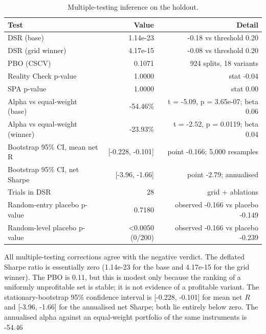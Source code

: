 \documentclass[11pt,a4paper]{article}
\begin{document}
\begin{table}[htbp]
\centering
\small
\setlength{\tabcolsep}{4pt}
\caption{Multiple-testing inference on the holdout.}
\label{tab:inference}
\begin{tabular}{lrr}
\toprule
Test & Value & Detail \\
\midrule
DSR (base) & 1.14e-23 & -0.18 vs threshold 0.20 \\
DSR (grid winner) & 4.17e-15 & -0.08 vs threshold 0.20 \\
PBO (CSCV) & 0.1071 & 924 splits, 18 variants \\
Reality Check p-value & 1.0000 & stat -0.04 \\
SPA p-value & 1.0000 & stat 0.00 \\
Alpha vs equal-weight (base) & -54.46\% & t = -5.09, p = 3.65e-07; beta 0.06 \\
Alpha vs equal-weight (winner) & -23.93\% & t = -2.52, p = 0.0119; beta 0.04 \\
Bootstrap 95\% CI, mean net R & [-0.228, -0.101] & point -0.166; 5,000 resamples \\
Bootstrap 95\% CI, net Sharpe & [-3.96, -1.66] & point -2.79; annualised \\
Trials in DSR & 28 & grid + ablations \\
Random-entry placebo p-value & 0.7180 & observed -0.166 vs placebo -0.149 \\
Random-level placebo p-value & <0.0050 (0/200) & observed -0.166 vs placebo -0.239 \\
\bottomrule
\end{tabular}
\end{table}
All multiple-testing corrections agree with the negative verdict. The deflated Sharpe ratio is essentially zero (1.14e-23 for the base and 4.17e-15 for the grid winner). The PBO is 0.11, but this is modest only because the ranking of a uniformly unprofitable set is stable; it is not evidence of a profitable variant. The stationary-bootstrap 95\% confidence interval is [-0.228, -0.101] for mean net $R$ and [-3.96, -1.66] for the annualised net Sharpe; both lie entirely below zero. The annualised alpha against an equal-weight portfolio of the same instruments is -54.46%
\end{document}

